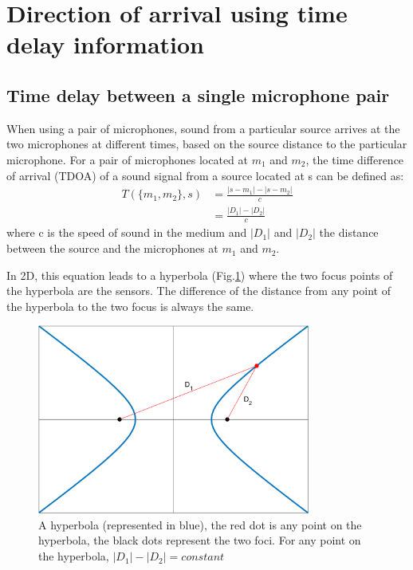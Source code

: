\section{Direction of arrival using time delay information}
\subsection{Time delay between a single microphone pair}\label{sec:TDOA}

When using a pair of microphones, sound from a particular source arrives at the two microphones at different times, based on the source distance to the particular microphone. For a pair of microphones located at $m_{1}$ and $m_{2}$, the time difference of arrival (TDOA) of a sound signal from a source located at s can be defined as:
\begin{equation}
    \begin{split}
    T(\{m_{1},m_{2}\},s)&=\frac{|s-m_{1}|-|s-m_{2}|}{c}\\
                        &=\frac{|D_{1}|-|D_{2}|}{c}
    \label{eq:tdoa}
    \end{split}
\end{equation}
where c is the speed of sound in the medium and $|D_{1}|$ and $|D_{2}|$ the distance between the source and the microphones at $m_1$ and $m_2$.

In 2D, this equation leads to a hyperbola (Fig.\ref{eq:tdoa}) where the two focus points of the hyperbola are the sensors. The difference of the distance from any point of the hyperbola to the two focus is always the same.

\begin{figure}[H]
    \centering
    \includegraphics[width=0.8\textwidth]{Figures/hyperbola.png}
    \caption{A hyperbola (represented in blue), the red dot is any point on the hyperbola, the black dots represent the two foci. For any point on the hyperbola, $|D_1|-|D_2| = constant$}
    \label{eq:tdoa}
\end{figure}

